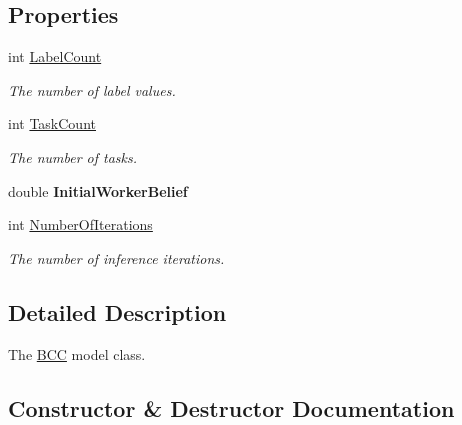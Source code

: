 \subsection*{Properties}
\begin{DoxyCompactItemize}
\item 
int \hyperlink{class_crowdsourcing_models_1_1_b_c_c_a38f7ecffc9acead6a585fab6ceae67a8}{Label\+Count}
\begin{DoxyCompactList}\small\item\em The number of label values. \end{DoxyCompactList}\item 
int \hyperlink{class_crowdsourcing_models_1_1_b_c_c_a79d1a31d02990f09b9b88eff57ad1920}{Task\+Count}
\begin{DoxyCompactList}\small\item\em The number of tasks. \end{DoxyCompactList}\item 
\hypertarget{class_crowdsourcing_models_1_1_b_c_c_abb3255af092632ce5366f536b73f8d7e}{}double {\bfseries Initial\+Worker\+Belief}\label{class_crowdsourcing_models_1_1_b_c_c_abb3255af092632ce5366f536b73f8d7e}

\item 
int \hyperlink{class_crowdsourcing_models_1_1_b_c_c_aa5cce09f39a4144782ac97f490747792}{Number\+Of\+Iterations}
\begin{DoxyCompactList}\small\item\em The number of inference iterations. \end{DoxyCompactList}\end{DoxyCompactItemize}


\subsection{Detailed Description}
The \hyperlink{class_crowdsourcing_models_1_1_b_c_c}{B\+C\+C} model class. 



\subsection{Constructor \& Destructor Documentation}
\hypertarget{class_crowdsourcing_models_1_1_b_c_c_aa8e876e451624f41cce4af6f38c3baf2}{}
